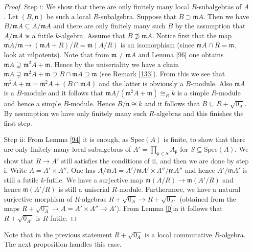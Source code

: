 \documentclass{amsart}
\theoremstyle{plain}
\theoremstyle{definition}
\begin{document}
\begin{proof}
Step i: We show that there are only finitely many local $R$-subalgebras of $A$. Let $(B,\mathfrak{n})$ be such a local $R$-subalgebra. 
Suppose that $B \supset {\mathfrak{m}} A$. Then we have $B/{\mathfrak{m}} A \subseteq A/{\mathfrak{m}} A$ and there are only finitely many such $B$ by the assumption that $A/{\mathfrak{m}} A$ is a
futile
$k$-algebra. 
Assume that $B \not \supset {\mathfrak{m}} A$. Notice first that the map ${\mathfrak{m}} A/{\mathfrak{m}} \to ({\mathfrak{m}} A + R )/R={\mathfrak{m}}(A/R)$ is an isomorphism (since ${\mathfrak{m}} A \cap R = {\mathfrak{m}}$,
look at nilpotents). Note that from ${\mathfrak{m}} \neq {\mathfrak{m}} A$ and Lemma \ref{96} one obtains ${\mathfrak{m}} A \supsetneq {\mathfrak{m}}^2 A+{\mathfrak{m}}$. 
Hence by the uniseriality we have a chain ${\mathfrak{m}} A \supsetneq {\mathfrak{m}}^2 A +{\mathfrak{m}} \supseteq B \cap {\mathfrak{m}} A \supseteq {\mathfrak{m}}$ (see Remark \ref{133}). From this we see that
${\mathfrak{m}}^2 A+ {\mathfrak{m}} ={\mathfrak{m}}^2 A+ \left(B \cap {\mathfrak{m}} A\right)$ and the latter is obviously a $B$-module. Also ${\mathfrak{m}} A$ is a $B$-module and it follows that ${\mathfrak{m}} A/({\mathfrak{m}}^2 A +{\mathfrak{m}})
\cong_R k$ is a simple $R$-module and hence a simple $B$-module. Hence $B/\mathfrak{n} \cong k$ and it follows that $B \subseteq R + \sqrt{0_A}$. By
assumption we have only finitely many such $R$-algebras and this finishes the first step.

Step ii: From Lemma \ref{94} it is enough, as $\mathrm{Spec}(A)$ is finite, to show that there are only finitely many local subalgebras of $A'=\prod_{{\mathfrak{p}}
\in S} A_{\mathfrak{p}}$ for $S \subseteq \mathrm{Spec}(A)$. We show that $R \to A'$ still satisfies the conditions of ii, and then we are done by step i. Write $A=A' \times A''$. One has $A/{\mathfrak{m}}
A = A'/{\mathfrak{m}} A' \times A''/{\mathfrak{m}} A''$ and hence $A'/{\mathfrak{m}} A'$ is still a futile $k$-futile. We have a surjective map ${\mathfrak{m}} (A/R) \to {\mathfrak{m}}(A'/R)$ and hence 
${\mathfrak{m}}(A'/R)$ is still a uniserial $R$-module. Furthermore, we have a natural surjective morphism of $R$-algebras $R + \sqrt{0_A} \to R + \sqrt{0_{A'}}$
(obtained from the maps $R + \sqrt{0_A} \to A=A' \times A'' \to A'$). From Lemma \ref{0}ia it follows that $R+\sqrt{0_{A'}}$ is $R$-futile.
\end{proof}

Note that in the previous statement $R+\sqrt{0_A}$ is a local commutative $R$-algebra. The next proposition handles this case.
\end{document}
